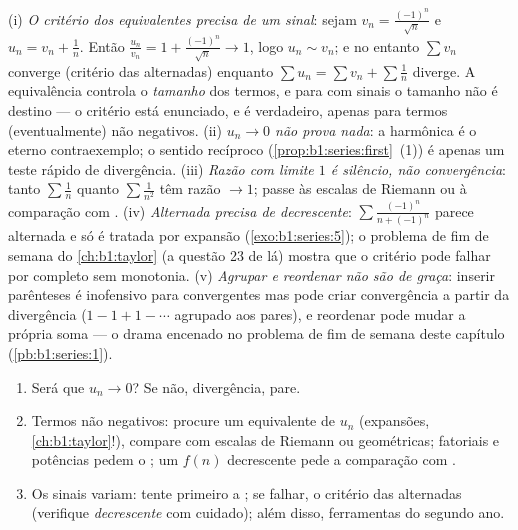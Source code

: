 \begin{remark}
(i) \emph{O critério dos equivalentes precisa de um sinal}: sejam
$v_n =
\frac{(-1)^n}{\sqrt n}$ e $u_n = v_n + \frac1n$. Então $\frac{u_n}{v_n} = 1 + \frac{(-1)^n}{\sqrt n} \to 1$, logo $u_n
\sim v_n$; e no entanto $\sum v_n$ converge
(critério das alternadas) enquanto $\sum u_n = \sum v_n + \sum \frac1n$ diverge. A equivalência
controla o \emph{tamanho} dos termos, e para  com sinais o
tamanho não é destino --- o critério está enunciado, e é verdadeiro,
apenas para termos (eventualmente) não negativos. (ii) \emph{$u_n \to 0$
não prova nada}: a  harmônica é o eterno contraexemplo; o
sentido recíproco (\cref{prop:b1:series:first}~(1)) é apenas um teste rápido de
divergência. (iii) \emph{Razão com limite $1$ é silêncio, não
convergência}: tanto $\sum\frac1n$ quanto $\sum\frac{1}{n^2}$ têm razão $\to 1$; passe às
escalas de Riemann ou à comparação com . (iv)
\emph{Alternada precisa de decrescente}: $\sum
\frac{(-1)^n}{n + (-1)^n}$ parece alternada e só
é tratada por expansão (\cref{exo:b1:series:5}); o problema de fim de semana do
\cref{ch:b1:taylor} (a questão 23 de lá) mostra que o critério pode falhar por
completo sem monotonia. (v) \emph{Agrupar e reordenar não são de
graça}: inserir parênteses é inofensivo para  convergentes mas
pode criar convergência a partir da divergência ($1 - 1 + 1 - \cdots$ agrupado aos
pares), e reordenar pode mudar a própria soma --- o drama encenado
no problema de fim de semana deste capítulo (\cref{pb:b1:series:1}).
\end{remark}

\begin{method}\label{met:b1:series:decide}
\begin{enumerate}
  \item Será que $u_n \to 0$? Se não, divergência, pare.
  \item Termos não negativos: procure um equivalente de $u_n$
        (expansões, \cref{ch:b1:taylor}!), compare com escalas de Riemann ou
        geométricas; fatoriais e potências pedem o ;
        um $f(n)$ decrescente pede a comparação com .
  \item Os sinais variam: tente primeiro a ; se
        falhar, o critério das alternadas (verifique
        \emph{decrescente} com cuidado); além disso, ferramentas do
        segundo ano.
\end{enumerate}
\end{method}

